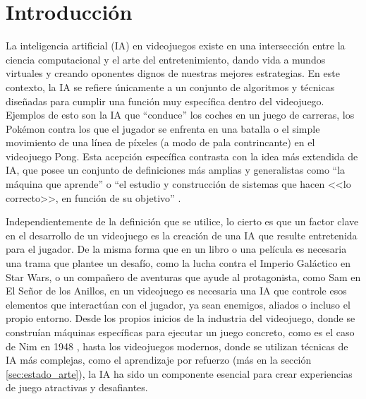 \chapter{Introducción} \label{chap:introduccion}


La inteligencia artificial (IA) en videojuegos existe en una intersección entre la ciencia computacional y el arte del entretenimiento, dando vida a mundos virtuales y creando oponentes dignos de nuestras mejores estrategias. En este contexto, la IA se refiere únicamente a un conjunto de algoritmos y técnicas diseñadas para cumplir una función muy específica dentro del videojuego. Ejemplos de esto son la IA que ``conduce'' los coches en un juego de carreras, los Pokémon contra los que el jugador se enfrenta en una batalla o el simple movimiento de una línea de píxeles (a modo de pala contrincante) en el videojuego Pong. Esta acepción específica contrasta con la idea más extendida de IA, que posee un conjunto de definiciones más amplias y generalistas como ``la máquina que aprende'' o ``el estudio y construcción de sistemas que hacen <<lo correcto>>, en función de su objetivo'' \cite{russell_artificial_2020}.

Independientemente de la definición que se utilice, lo cierto es que un factor clave en el desarrollo de un videojuego es la creación de una IA que resulte entretenida para el jugador. De la misma forma que en un libro o una película es necesaria una trama que plantee un desafío, como la lucha contra el Imperio Galáctico en Star Wars, o un compañero de aventuras que ayude al protagonista, como Sam en El Señor de los Anillos, en un videojuego es necesaria una IA que controle esos elementos que interactúan con el jugador, ya sean enemigos, aliados o incluso el propio entorno. Desde los propios inicios de la industria del videojuego, donde se construían máquinas específicas para ejecutar un juego concreto, como es el caso de Nim en 1948 \cite{redheffer_machine_1948}, hasta los videojuegos modernos, donde se utilizan técnicas de IA más complejas, como el aprendizaje por refuerzo (más en la sección \ref{sec:estado_arte}), la IA ha sido un componente esencial para crear experiencias de juego atractivas y desafiantes.

